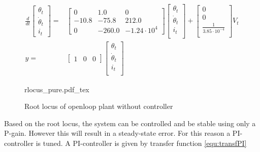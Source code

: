 \documentclass[../../../Main]{subfiles}
\begin{document}
\begin{equation}
      \begin{split}
      \label{eq:zero_linearized}
      \frac{d}{dt}
    \begin{bmatrix}
        \theta_t \\
        \dot \theta_t \\
        i_t
    \end{bmatrix}
    =&
    \begin{bmatrix}0 & 1.0 & 0\\ -10.8 & -75.8 & 212.0\\ 0 & -260.0 & -1.24\cdot10^{4}\end{bmatrix}
    \begin{bmatrix}
        \theta_t \\
        \dot \theta_t \\
        i_t \\
    \end{bmatrix}
    +
    \begin{bmatrix}
        0 \\
        0 \\
	\frac{1}{3.85\cdot10^{-4}}\\
    \end{bmatrix}
    V_t
\\
      y =&
    \begin{bmatrix}
        1 & 0 & 0
    \end{bmatrix}
    \begin{bmatrix}
        \theta_t \\
        \dot \theta_t\\
        i_t\\
    \end{bmatrix}
    \end{split}
\end{equation}
\begin{figure}[H]
\centering
\def\svgwidth{\textwidth}
{rlocus_pure.pdf_tex}
\caption{Root locus of openloop plant without controller}
\label{fig:rlocus_pure}
\end{figure}

Based on the root locus, the system can be controlled and be stable using only a P-gain.
However this will result in a steady-state error. For this reason a PI-controller is tuned.
A PI-controller is given by transfer function \eqref{equ:transfPI}
\end{document}
